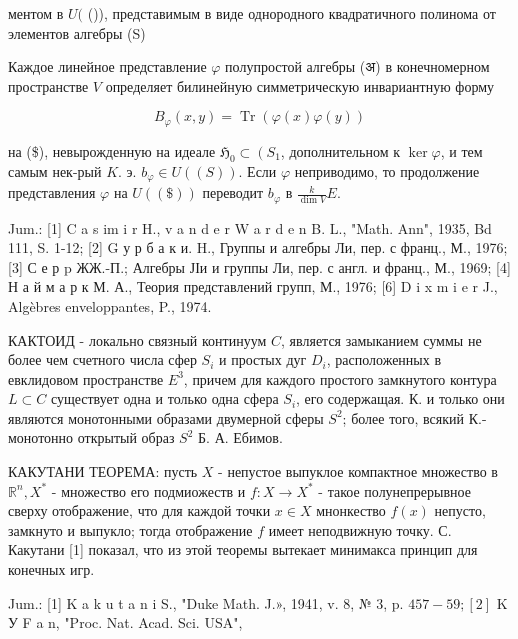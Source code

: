\documentclass[10pt]{article}
\begin{document}
ментом в $U($ ()), представимым в виде однородного квадратичного полинома от элементов алгебры (S)



Каждое линейное представление $\varphi$ полупростой алгебры (अ) в конечномерном пространстве $V$ определяет билинейную симметрическую инвариантную форму



\[

B_{\varphi}(x, y)=\operatorname{Tr}(\varphi(x) \varphi(y))

\]



на (\$), невырожденную на идеале $\mathfrak{H}_{0} \subset\left(S_{1}\right.$, дополнительном к $\operatorname{ker} \varphi$, и тем самым нек-рый $K$. э. $b_{\varphi} \in U((S))$. Если $\varphi$ неприводимо, то продолжение представления $\varphi$ на $U((\$))$ переводит $b_{\varphi}$ в $\frac{k}{\operatorname{dim} V} E$.



Jum.: [1] C a s im i r H., v a n d e r W a r d e n B. L., "Math. Ann", 1935, Bd 111, S. 1-12; [2] G у р б а к и. H., Группы и алгебры Ли, пер. с франц., М., 1976; [3] С е р p ЖЖ.-П.; Алгебры ЈІи и группы Ли, пер. с англ. и франц., М., 1969; [4] Н а й м а р к М. А., Теория представлений групп, М., 1976; [6] D i x m i e r J., Algèbres enveloppantes, P., 1974.



КАКТОИД - локально связный континуум $C$, является замыканием суммы не более чем счетного числа сфер $S_{i}$ и простых дуг $D_{i}$, расположенных в евклидовом пространстве $E^{3}$, причем для каждого простого замкнутого контура $L \subset C$ существует одна и только одна сфера $S_{i}$, его содержащая. К. и только они являются монотонными образами двумерной сферы $S^{2}$; более того, всякий К.- монотонно открытый образ $S^{2}$ Б. А. Ебимов.



КАКУТАНИ ТЕОРЕМА: пусть $X$ - непустое выпуклое компактное множество в $\mathbb{R}^{n}, X^{*}$ - множество его подмиожеств и $f: X \rightarrow X^{*}$ - такое полунепрерывное сверху отображение, что для каждой точки $x \in X$ мнонкество $f(x)$ непусто, замкнуто и выпукло; тогда отображение $f$ имеет неподвижную точку. С. Какутани [1] показал, что из этой теоремы вытекает минимакса принцип для конечных игр.



Jum.: [1] K a k u t a n i S., "Duke Math. J.», 1941, v. 8, № 3, p. $457-59 ;[2]$ K У F a n, "Proc. Nat. Acad. Sci. USA",
\end{document}

